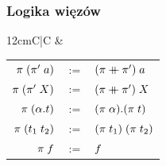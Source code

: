 \documentclass[aspectratio=169]{beamer}
\begin{document}
\begin{frame}
\frametitle{Logika więzów}
  \begin{tabularx}{12cm}{C|C}
    \hline & \\
      \begin{tabular}{rcl}
        $\pi \; (\pi' \; a) $ & $:=$ & $(\perm \++ \perm') \apperm \atomv$ \\
        $\pi \; (\pi' \; X) $ & $:=$ & $(\perm \++ \perm') \apperm \termv$ \\
        $\pi \; (\alpha. t)$ & $:=$ & $(\pi \; \alpha). (\pi \; t)$ \\
        $\pi \; (t_1 \; t_2) $ & $:=$ & $(\pi \; t_1) \; (\pi \; t_2)$ \\
        $\pi \; f                   $ & $:=$ & $f$ \\

\end{tabular}
\end{tabularx}
\end{frame}
\end{document}
